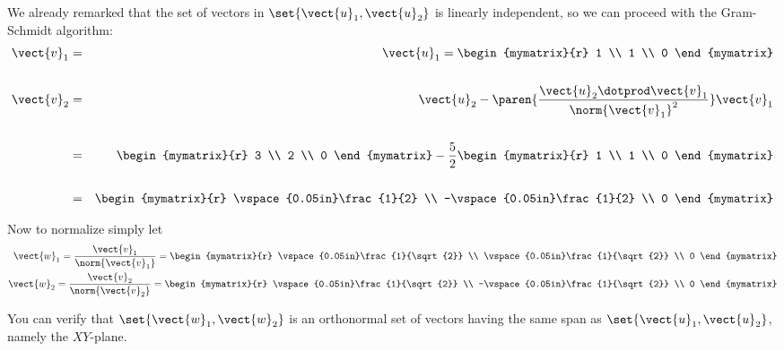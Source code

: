 \begin{solution}
We already remarked that the set of vectors in $\set{\vect{u}_1,
\vect{u}_2}$ is linearly independent, so we can proceed with the
Gram-Schmidt algorithm:
\begin{eqnarray*}
\vect{v}_1 &=& \vect{u}_1 =  \begin{mymatrix}{r}
1 \\
1 \\
0
\end{mymatrix} \\
&& \\
\vect{v}_{2} &=& \vect{u}_{2} - \paren{\dfrac{\vect{u}_2 \dotprod \vect{v}_1}{\norm{\vect{v}_1}^2}}  \vect{v}_1\\ 
&& \\
&=& \begin{mymatrix}{r}
3 \\
2 \\
0
\end{mymatrix}
- 
\frac{5}{2} 
 \begin{mymatrix}{r}
1 \\
1 \\
0
\end{mymatrix} \\
&&\\
&=&  \begin{mymatrix}{r}
\vspace{0.05in}\frac{1}{2} \\
-\vspace{0.05in}\frac{1}{2} \\
0
\end{mymatrix} 
\end{eqnarray*}

Now to normalize simply let 
\begin{eqnarray*}
\vect{w}_1  = \frac{\vect{v}_1}{\norm{\vect{v}_1}}  = \begin{mymatrix}{r}
\vspace{0.05in}\frac{1}{\sqrt{2}}  \\
\vspace{0.05in}\frac{1}{\sqrt{2}} \\
0
\end{mymatrix} \\
\vect{w}_2  = \frac{\vect{v}_2}{\norm{\vect{v}_2}}  = \begin{mymatrix}{r}
\vspace{0.05in}\frac{1}{\sqrt{2}}  \\
-\vspace{0.05in}\frac{1}{\sqrt{2}} \\
 0
\end{mymatrix}
\end{eqnarray*}

You can verify that $\set{\vect{w}_1, \vect{w}_2}$ is an orthonormal set of vectors  having the same span as
$\set{\vect{u}_1, \vect{u}_2}$,  namely the $XY$-plane.
\end{solution}


